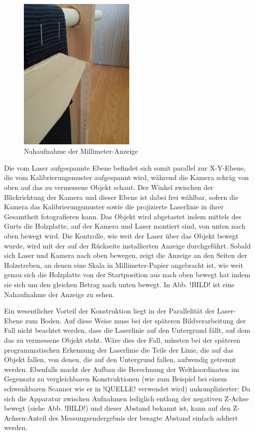 \begin{figure}
\centering \includegraphics[width=0.5\textwidth, angle = -90]{images/Scanner3.jpg}
\caption{Nahaufnahme der Millimeter-Anzeige}\label{fig:scanner3}
\end{figure}

\bigbreak
Die vom Laser aufgespannte Ebene befindet sich somit parallel zur X-Y-Ebene, die vom Kalibrierungsmuster aufgespannt wird, während die Kamera schräg von oben auf das zu vermessene Objekt schaut. Der Winkel zwischen der Blickrichtung der Kamera und dieser Ebene ist dabei frei wählbar, sofern die Kamera das Kalibrierungsmuster sowie die projizierte Laserlinie in ihrer Gesamtheit fotografieren kann.  Das Objekt wird abgetastet indem mittels des Gurts die Holzplatte, auf der Kamera und Laser montiert sind, von unten nach oben bewegt wird. Die Kontrolle, wie weit der Laser über das Objekt bewegt wurde, wird mit der auf der Rückseite installierten Anzeige durchgeführt. Sobald sich Laser und Kamera nach oben bewegen, zeigt die Anzeige an den Seiten der Holzstreben, an denen eine Skala in Millimeter-Papier angebracht ist, wie weit genau sich die Holzplatte von der Startposition aus nach oben bewegt hat indem sie sich um den gleichen Betrag nach unten bewegt. In Abb. !BILD! ist eine Nahaufnahme der Anzeige zu sehen. 
\bigbreak

Ein wesentlicher Vorteil der Konstruktion liegt in der Parallelität der Laser-Ebene zum Boden. Auf diese Weise muss bei der späteren Bildverarbeitung der Fall nicht beachtet werden, dass die Laserlinie auf den Untergrund fällt, auf dem das zu vermessene Objekt steht. Wäre dies der Fall, müssten bei der späteren programmatischen Erkennung der Laserlinie die Teile der Linie, die auf das Objekt fallen, von denen, die auf den Untergrund fallen, aufwendig getrennt werden. Ebenfalls macht der Aufbau die Berechnung der Weltkoordinaten im Gegensatz zu vergleichbaren Konstruktionen (wie zum Beispiel bei einem schwenkbaren Scanner wie er in !QUELLE! verwendet wird) unkomplizierter: Da sich die Apparatur zwischen Aufnahmen lediglich entlang der negativen Z-Achse bewegt (siehe Abb. !BILD!) und dieser Abstand bekannt ist, kann auf den Z-Achsen-Anteil des Messungsendergebnis der besagte Abstand einfach addiert werden.
\bigbreak

